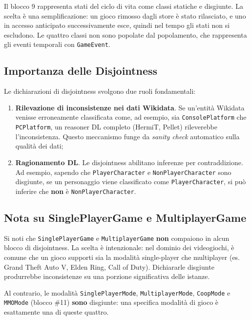 Il blocco 9 rappresenta stati del ciclo di vita come classi statiche e disgiunte. La scelta \`e una
semplificazione: un gioco rimosso dagli store \`e stato rilasciato, e uno in accesso anticipato
successivamente esce, quindi nel tempo gli stati non si escludono. Le quattro classi non sono popolate
dal popolamento, che rappresenta gli eventi temporali con \texttt{GameEvent}.

\subsection{Importanza delle Disjointness}

Le dichiarazioni di disjointness svolgono due ruoli fondamentali:

\begin{enumerate}[nosep]
  \item \textbf{Rilevazione di inconsistenze nei dati Wikidata}. Se un'entit\`a
    Wikidata venisse erroneamente classificata come, ad esempio, sia
    \texttt{ConsolePlatform} che \texttt{PCPlatform}, un reasoner DL completo
    (HermiT, Pellet) rileverebbe l'inconsistenza. Questo meccanismo funge da
    \textit{sanity check} automatico sulla qualit\`a dei dati;
  \item \textbf{Ragionamento DL}. Le disjointness abilitano inferenze per
    contraddizione. Ad esempio, sapendo che \texttt{PlayerCharacter} e
    \texttt{NonPlayerCharacter} sono disgiunte, se un personaggio viene
    classificato come \texttt{PlayerCharacter}, si pu\`o inferire che
    \textbf{non} \`e \texttt{NonPlayerCharacter}.
\end{enumerate}

\subsection{Nota su SinglePlayerGame e MultiplayerGame}

Si noti che \texttt{SinglePlayerGame} e \texttt{MultiplayerGame} \textbf{non}
compaiono in alcun blocco di disjointness. La scelta \`e intenzionale: nel dominio
dei videogiochi, \`e comune che un gioco supporti sia la modalit\`a single-player
che multiplayer (es. Grand Theft Auto V, Elden Ring, Call of Duty). Dichiararle
disgiunte produrrebbe inconsistenze su una porzione significativa delle istanze.

Al contrario, le modalit\`a \texttt{SinglePlayerMode}, \texttt{MultiplayerMode},
\texttt{CoopMode} e \texttt{MMOMode} (blocco \#11) \textbf{sono} disgiunte:
una specifica modalit\`a di gioco \`e esattamente una di queste quattro.
